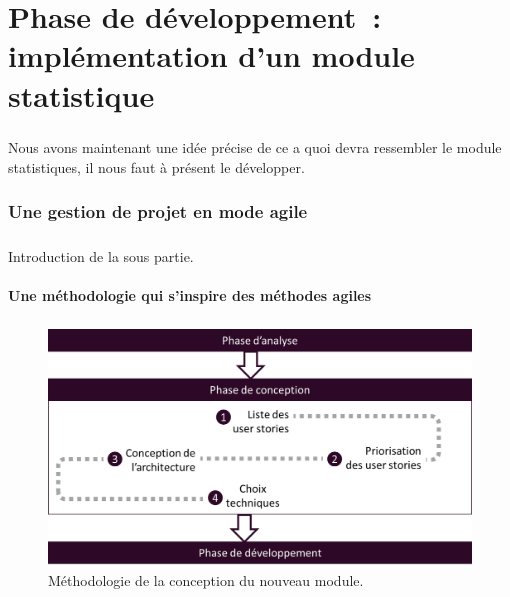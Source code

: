 \chapter{Phase de développement~: implémentation d'un module statistique}
	\paragraph{}
	Nous avons maintenant une idée précise de ce a quoi devra ressembler le module
	statistiques, il nous faut à présent le développer.
	
	\subsection{Une gestion de projet en mode agile}
		\paragraph{}
		Introduction de la sous partie.
		
		\subsubsection{Une méthodologie qui s'inspire des méthodes agiles}
			\paragraph{}
			
			\begin{figure}[H]%
				\centering
				\includegraphics[width=15cm]{../img/part3/methodo_conception.png}
				\caption{\label{methodo_conception} Méthodologie de la conception du
				nouveau module.}
			\end{figure}
			
